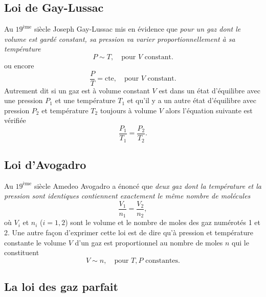 \documentclass[a4paper,12pt]{book}
\begin{document}
\subsection{Loi de Gay-Lussac}

Au $19^{\mbox{ème}}$ siècle Joseph Gay-Lussac mis en évidence que \textit{pour un gaz dont le volume est gardé constant, sa pression va varier proportionnellement à sa température}
\begin{equation}
P\sim T,\quad \mbox{pour }V\mbox{ constant.}
\end{equation}
ou encore 
\begin{equation}
\frac{P}{T}=\mbox{cte},\quad \mbox{pour }V\mbox{ constant.}\label{eq_loi_gaylussac}
\end{equation}
Autrement dit si un gaz est à volume constant $V$ est dans un état d'équilibre avec une pression $P_1$ et
une température $T_1$ et qu'il y a un autre état d'équilibre avec pression $P_2$ et température $T_2$ toujours à volume $V$ alors l'équation suivante est vérifiée
\begin{equation}
\frac{P_1}{T_1}=\frac{P_2}{T_2}.
\end{equation}

\subsection{Loi d'Avogadro}

Au $19^{\mbox{ème}}$ siècle Amedeo Avogadro a énoncé que \textit{deux gaz dont la température et la pression sont identiques contiennent exactement le même nombre de molécules}
\begin{equation}
\frac{V_1}{n_1}=\frac{V_2}{n_2},
\end{equation}
où $V_i$ et $n_i$ ($i=1,2$) sont le volume et le nombre de moles des gaz numérotés 1 et 2.
Une autre façon d'exprimer cette loi est de dire qu'à pression et température constante 
le volume $V$ d'un gaz est proportionnel au nombre de moles $n$ qui le constituent
\begin{equation}
V\sim n,\quad \mbox{pour $T,P$ constantes}.
\end{equation}

\subsection{La loi des gaz parfait}
\end{document}
